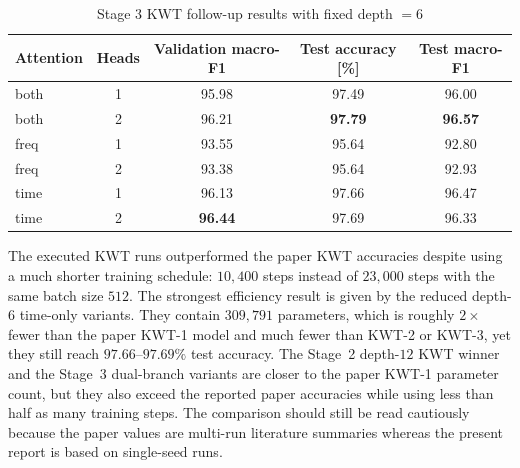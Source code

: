 \documentclass[11pt]{article}
\begin{document}
\begin{table}[b!]
\centering
\caption{Stage 3 KWT follow-up results with fixed depth \(=6\)}
\label{tab:stage3-results}
\smallskip
\small
\begin{tabular}{@{}lcccc@{}}
\toprule
\textbf{Attention} & \textbf{Heads} & \textbf{Validation macro-F1} & \textbf{Test accuracy [\%]} & \textbf{Test macro-F1}\\
\midrule
both & 1 & 95.98 & 97.49 & 96.00 \\
both & 2 & 96.21 & \textbf{97.79} & \textbf{96.57} \\
freq & 1 & 93.55 & 95.64 & 92.80 \\
freq & 2 & 93.38 & 95.64 & 92.93 \\
time & 1 & 96.13 & 97.66 & 96.47 \\
time & 2 & \textbf{96.44} & 97.69 & 96.33 \\
\bottomrule
\end{tabular}
\end{table}


The executed KWT runs outperformed the paper KWT accuracies despite using a much shorter training schedule: \(10{,}400\) steps instead of \(23{,}000\) steps with the same batch size \(512\). The strongest efficiency result is given by the reduced depth-\(6\) time-only variants. They contain \(309{,}791\) parameters, which is roughly \(2\times\) fewer than the paper KWT-1 model and much fewer than KWT-2 or KWT-3, yet they still reach \(97.66\)--\(97.69\%\) test accuracy. The Stage~2 depth-\(12\) KWT winner and the Stage~3 dual-branch variants are closer to the paper KWT-1 parameter count, but they also exceed the reported paper accuracies while using less than half as many training steps. The comparison should still be read cautiously because the paper values are multi-run literature summaries whereas the present report is based on single-seed runs.
\end{document}
